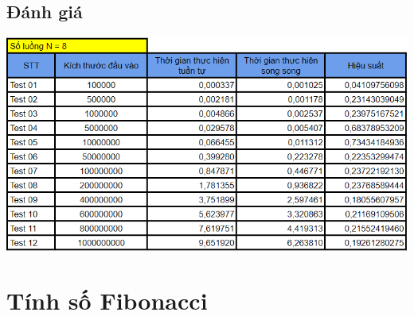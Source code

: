 \documentclass[12pt,a4paper]{report}
\begin{document}
\section{Đánh giá}
\begin{center}
	\includegraphics[scale=0.9]{./Photos/Primes/Benchmark.PNG}
\end{center}

\chapter{Tính số Fibonacci}
\end{document}
